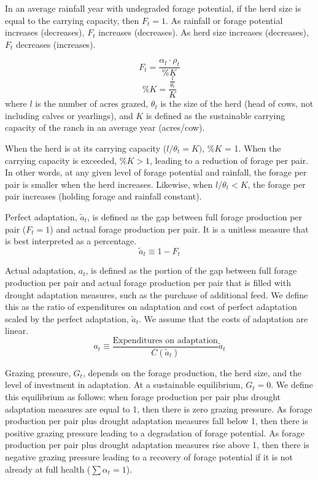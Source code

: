 \documentclass[11pt]{article}
\begin{document}
In an average rainfall year with undegraded forage potential, if the herd size is equal to the carrying capacity, then $F_t = 1$. As rainfall or forage potential increases (decreases), $F_t$ increases (decreases). As herd size increases (decreases), $F_t$ decreases (increases). 

\begin{equation}
F_t = \frac{\alpha_t \cdot \rho_t}{\%K}
\end{equation}
\begin{equation}
\%K = \frac{\frac{l}{\theta_t}}{K}
\end{equation}
where $l$ is the number of acres grazed, $\theta_t$ is the size of the herd (head of cows, not including calves or yearlings), and $K$ is defined as the sustainable carrying capacity of the ranch in an average year (acres/cow).

When the herd is at its carrying capacity ($l/\theta_t = K)$, $\%K$ = 1. When the carrying capacity is exceeded, $\%K > 1$, leading to a reduction of forage per pair. In other words, at any given level of forage potential and rainfall, the forage per pair is smaller when the herd increases. Likewise, when $l / \theta_t < K$, the forage per pair increases (holding forage and rainfall constant). 

Perfect adaptation, $\tilde{a}_t$, is defined as the gap between full forage production per pair ($F_t = 1$) and actual forage production per pair. It is a unitless measure that is best interpreted as a percentage.
\begin{equation}
\tilde{a}_t \equiv 1 - F_t
\end{equation}

Actual adaptation, $a_t$, is defined as the portion of the gap between full forage production per pair and actual forage production per pair that is filled with drought adaptation measures, such as the purchase of additional feed. We define this as the ratio of expenditures on adaptation and cost of perfect adaptation scaled by the perfect adaptation, $\tilde{a}_t$. We assume that the costs of adaptation are linear. 
\begin{equation}
a_t \equiv \frac{\text{Expenditures on adaptation}}{C(\tilde{a}_t)} \tilde{a}_t
\end{equation}

Grazing pressure, $G_t$, depends on the forage production, the herd size, and the level of investment in adaptation. 
At a sustainable equilibrium, $G_t = 0$. 
We define this equilibrium as follows: when forage production per pair plus drought adaptation measures are equal to 1, then there is zero grazing pressure. As forage production per pair plus drought adaptation measures fall below 1, then there is positive grazing pressure leading to a degradation of forage potential. As forage production per pair plus drought adaptation measures rise above 1, then there is negative grazing pressure leading to a recovery of forage potential if it is not already at full health ($\sum \alpha_t = 1$).  
\end{document}
